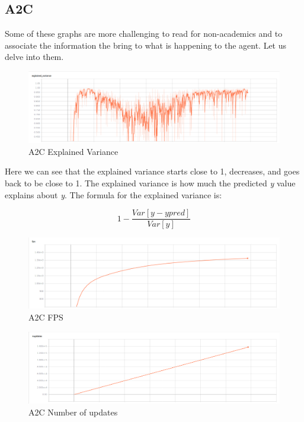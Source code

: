 \documentclass[11pt,twoside,a4paper]{article}
\begin{document}
\subsection*{A2C}

Some of these graphs are more challenging to read for non-academics and to
associate the information the bring to what is happening to the agent. Let us
delve into them.

\begin{figure}[H]
  \includegraphics[scale=0.30]{images/graphs/a2c-explained_variance-clean.png}
  \centering
  \caption{A2C Explained Variance}
  \label{fig:a2c-explained_variance}
\end{figure}

Here we can see that the explained variance starts close to 1, decreases, and
goes back to be close to 1. The explained variance is how much the predicted
\emph{y} value explains about \emph{y}. The formula for the explained variance
is:

$$
1 - \frac{Var[y-ypred]}{Var[y]}
$$

\begin{figure}[H]
  \includegraphics[scale=0.30]{images/graphs/a2c-fps-clean.png}
  \centering
  \caption{A2C FPS}
  \label{fig:a2c-fps}
\end{figure}

\begin{figure}[H]
  \includegraphics[scale=0.30]{images/graphs/a2c-nupdates-clean.png}
  \centering
  \caption{A2C Number of updates}
  \label{fig:a2c-nupdates}
\end{figure}
\end{document}
